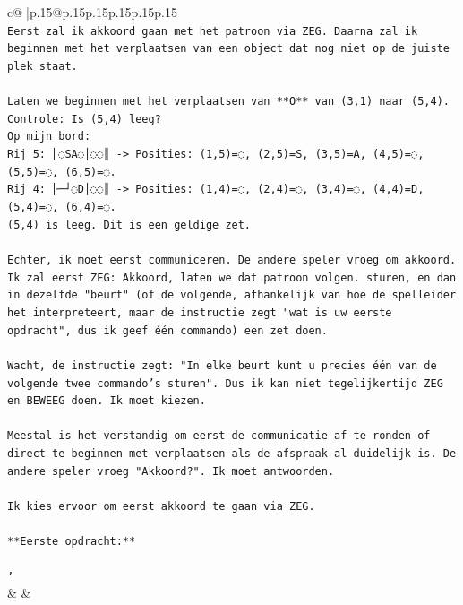 \documentclass{article}
\begin{document}
{\begin{supertabular}{c@{$\;$}|p{.15\linewidth}@{}p{.15\linewidth}p{.15\linewidth}p{.15\linewidth}p{.15\linewidth}p{.15\linewidth}}
{{{\\ 
\texttt{Eerst zal ik akkoord gaan met het patroon via ZEG. Daarna zal ik beginnen met het verplaatsen van een object dat nog niet op de juiste plek staat.} \\
\\ 
\texttt{Laten we beginnen met het verplaatsen van **O** van (3,1) naar (5,4).} \\
\texttt{Controle: Is (5,4) leeg?} \\
\texttt{Op mijn bord:} \\
\texttt{Rij 5: ║◌SA◌│◌◌║ {-}> Posities: (1,5)=◌, (2,5)=S, (3,5)=A, (4,5)=◌, (5,5)=◌, (6,5)=◌.} \\
\texttt{Rij 4: ╟─┘◌D│◌◌║ {-}> Posities: (1,4)=◌, (2,4)=◌, (3,4)=◌, (4,4)=D, (5,4)=◌, (6,4)=◌.} \\
\texttt{(5,4) is leeg. Dit is een geldige zet.} \\
\\ 
\texttt{Echter, ik moet eerst communiceren. De andere speler vroeg om akkoord. Ik zal eerst ZEG: Akkoord, laten we dat patroon volgen. sturen, en dan in dezelfde "beurt" (of de volgende, afhankelijk van hoe de spelleider het interpreteert, maar de instructie zegt "wat is uw eerste opdracht", dus ik geef één commando) een zet doen.} \\
\\ 
\texttt{Wacht, de instructie zegt: "In elke beurt kunt u precies één van de volgende twee commando's sturen". Dus ik kan niet tegelijkertijd ZEG en BEWEEG doen. Ik moet kiezen.} \\
\\ 
\texttt{Meestal is het verstandig om eerst de communicatie af te ronden of direct te beginnen met verplaatsen als de afspraak al duidelijk is. De andere speler vroeg "Akkoord?". Ik moet antwoorden.} \\
\\ 
\texttt{Ik kies ervoor om eerst akkoord te gaan via ZEG.} \\
\\ 
\texttt{**Eerste opdracht:**} \\
\\ 
\texttt{'} \\
            }
        }
    }
    & & \\ \\


\end{supertabular}}
\end{document}
